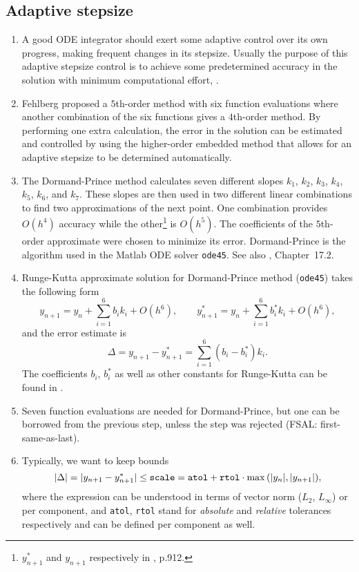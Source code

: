 \documentclass[]{article}
\begin{document}
\subsection{Adaptive stepsize}
\begin{enumerate}
\item A good ODE integrator should exert some adaptive control over its own progress,
making frequent changes in its stepsize. Usually the purpose of this adaptive stepsize
control is to achieve some predetermined accuracy in the solution with minimum
computational effort, \cite{NR07}.
\item Fehlberg \cite{Fehlberg69} proposed a $5$th-order method with six function evaluations where another combination of the six functions gives a $4$th-order method.  By performing one extra calculation, the error in the solution can be estimated and controlled by using the higher-order embedded method that allows for an adaptive stepsize to be determined automatically.
\item The Dormand-Prince method \cite{Dormand80} calculates seven different slopes $k_1$, $k_2$, $k_3$, $k_4$, $k_5$, $k_6$, and $k_7$.	These slopes are then used in two different linear combinations to find two approximations of the next point. One combination provides $O(h^4)$ accuracy while the other\footnote{$y^*_{n+1}$ and $y_{n+1}$ respectively in \cite{NR07}, p.912.} is $O(h^5)$. The coefficients of the $5$th-order approximate were chosen to minimize its error. Dormand-Prince is the algorithm used in the Matlab ODE solver \texttt{ode45}. See also \cite{NR07}, Chapter~17.2.
\item Runge-Kutta approximate solution for Dormand-Prince method (\texttt{ode45}) takes the following form
$$
y_{n+1} = y_n + \sum_{i=1}^6 b_i k_i + O(h^6), \qquad
y^*_{n+1} = y_n + \sum_{i=1}^6 b^*_i k_i + O(h^6),
$$
and the error estimate is
$$
\Delta = y_{n+1} - y^*_{n+1} = \sum_{i=1}^6 (b_i - b^*_i) k_i.
$$
The coefficients $b_i$, $b^*_i$ as well as other constants for Runge-Kutta can be found in \cite{Dormand80, NR07}.
\item Seven function evaluations are needed for Dormand-Prince, but one can be borrowed from the previous step, unless the step was rejected (FSAL: first-same-as-last).
\item Typically, we want to keep bounds
$$
|\Delta| = | y_{n+1} - y^*_{n+1} | \le \mbox{\tt scale} =
\mbox{\tt atol} + \mbox{\tt rtol} \cdot \max{\left(|y_n|,|y_{n+1}|\right)},
$$
where the expression can be understood in terms of vector norm ($L_2$, $L_{\infty}$) or per component, and {\tt atol}, {\tt rtol} stand for \textit{absolute} and \textit{relative} tolerances respectively and can be defined per component as well.

\end{enumerate}
\end{document}
